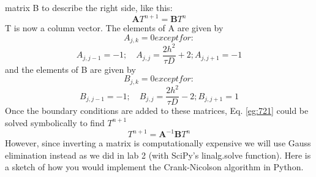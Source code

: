 \documentclass{book}
\theoremstyle{plain}
\theoremstyle{definition}
\numberwithin{exm}{chapter}
\theoremstyle{remark}
\theoremstyle{summary}
\theoremstyle{overview}
\begin{document}
matrix B to describe the right side, like this:
\begin{equation}\label{eq:721}
\mathbf{A} T^{n+1}=\mathbf{B} T^{n}
\end{equation}
T is now a column vector. The elements of A are given by\\
\begin{equation*}
A_{j, k}=0 except for : 
\end{equation*}
\begin{equation}\label{eq:722}
A_{j, j-1}=-1 ; \quad A_{j, j}=\frac{2 h^{2}}{\tau D}+2 ; A_{j, j+1}=-1
\end{equation}
and the elements of B are given by
\begin{equation*}
B_{j, k}=0 except for : 
\end{equation*}
\begin{equation}\label{eq:723}
B_{j, j-1}=-1 ; \quad B_{j, j}=\frac{2 h^{2}}{\tau D}-2 ; B_{j, j+1}=1
\end{equation}
Once the boundary conditions are added to these matrices, Eq. \eqref{eg:721} could be
solved symbolically to find $T^{n+1}$
\begin{equation}\label{eq:724}
T^{n+1}=\mathbf{A}^{-1} \mathbf{B} T^{n}
\end{equation}
However, since inverting a matrix is computationally expensive we will use Gauss
elimination instead as we did in lab 2 (with SciPy\rq s linalg.solve function). Here
is a sketch of how you would implement the Crank-Nicolson algorithm in Python.
\end{document}

